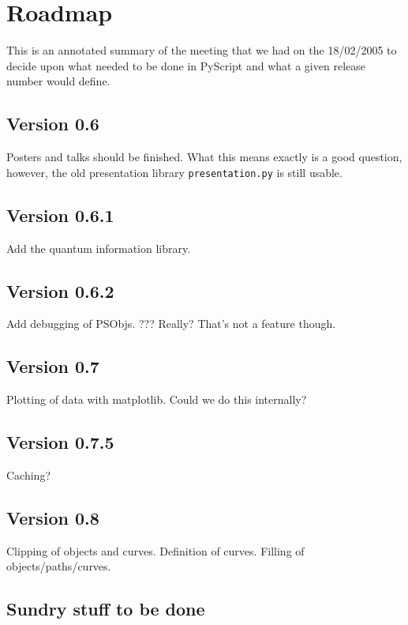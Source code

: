 \documentclass[12pt,a4paper]{article}
\begin{document}
\section{Roadmap}

This is an annotated summary of the meeting that we had on the 18/02/2005 to
decide upon what needed to be done in PyScript and what a given release
number would define.

\subsection{Version 0.6}

Posters and talks should be finished.  What this means exactly is a good
question, however, the old presentation library \texttt{presentation.py} is
still usable.

\subsection{Version 0.6.1}

Add the quantum information library.

\subsection{Version 0.6.2}

Add debugging of PSObjs.  ???  Really?  That's not a feature though.  

\subsection{Version 0.7}

Plotting of data with matplotlib.  Could we do this internally?

\subsection{Version 0.7.5}

Caching?

\subsection{Version 0.8}

Clipping of objects and curves.  Definition of curves.  Filling of
objects/paths/curves.

\subsection{Sundry stuff to be done}
\end{document}
